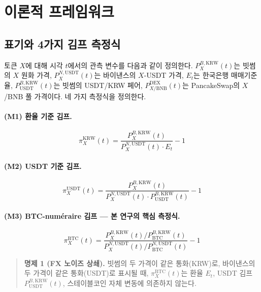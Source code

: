 \documentclass[11pt,a4paper]{article}
\begin{document}
\section{이론적 프레임워크}

\subsection{표기와 4가지 김프 측정식}

토큰 $X$에 대해 시각 $t$에서의 관측 변수를 다음과 같이 정의한다.
$P_X^{B,\text{KRW}}(t)$는 빗썸의 $X$ 원화 가격, $P_X^{N,\text{USDT}}(t)$는 바이낸스의 $X$-USDT 가격,
$E_t$는 한국은행 매매기준율, $P_{\text{USDT}}^{B,\text{KRW}}(t)$는 빗썸의 USDT/KRW 페어,
$P_{X/\text{BNB}}^{\text{DEX}}(t)$는 PancakeSwap의 $X$/BNB 풀 가격이다. 네 가지 측정식을 정의한다.

\paragraph{(M1) 환율 기준 김프.}
\begin{equation}
\pi^{\text{KRW}}_X(t) = \frac{P_X^{B,\text{KRW}}(t)}{P_X^{N,\text{USDT}}(t)\cdot E_t}-1
\label{eq:pi_krw}
\end{equation}

\paragraph{(M2) USDT 기준 김프.}
\begin{equation}
\pi^{\text{USDT}}_X(t) = \frac{P_X^{B,\text{KRW}}(t)}{P_X^{N,\text{USDT}}(t)\cdot P_{\text{USDT}}^{B,\text{KRW}}(t)}-1
\label{eq:pi_usdt}
\end{equation}

\paragraph{(M3) BTC-num\'eraire 김프 --- 본 연구의 핵심 측정식.}
\begin{equation}
\boxed{\;
\pi^{\text{BTC}}_X(t) = \frac{P_X^{B,\text{KRW}}(t)/P_{\text{BTC}}^{B,\text{KRW}}(t)}
                                {P_X^{N,\text{USDT}}(t)/P_{\text{BTC}}^{N,\text{USDT}}(t)} - 1
\;}
\label{eq:pi_btc}
\end{equation}

\begin{quote}
\textbf{명제 1 (FX 노이즈 상쇄).}
빗썸의 두 가격이 같은 통화(KRW)로, 바이낸스의 두 가격이 같은 통화(USDT)로 표시될 때,
$\pi^{\text{BTC}}_X(t)$는 환율 $E_t$, USDT 김프 $P_{\text{USDT}}^{B,\text{KRW}}(t)$,
스테이블코인 자체 변동에 의존하지 않는다.
\end{quote}
\end{document}
